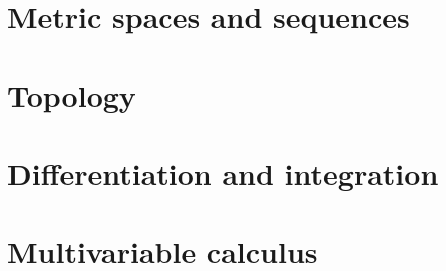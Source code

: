 \documentclass{article}
\begin{document}
\section{Metric spaces and sequences}

\section{Topology}

\section{Differentiation and integration}

\section{Multivariable calculus}


\newpage

\printbibliography
\end{document}

